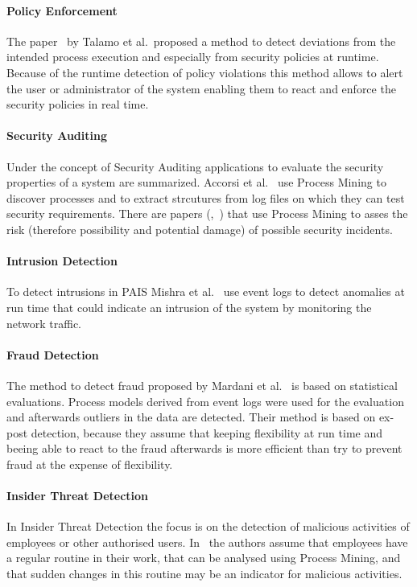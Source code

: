 \documentclass[runningheads]{llncs}
\begin{document}
\paragraph{Policy Enforcement} The paper~\cite{Talamo2013} by Talamo et al.\ proposed a method to detect deviations from the intended process execution and especially from security policies at runtime. Because of the runtime detection of policy violations this
method allows to alert the user or administrator of the system enabling them to react and enforce the security policies in real time.
\paragraph{Security Auditing} Under the concept of Security Auditing applications to evaluate the security properties of a system are summarized. Accorsi et al.~\cite{Accorsi20131462} use Process Mining to discover processes and to extract strcutures from log files
on which they can test security requirements. There are papers (\cite{Yunizal20221387},~\cite{Dedousis202235}) that use Process Mining to asses the risk (therefore possibility and potential damage) of possible security incidents.
\paragraph{Intrusion Detection} To detect intrusions in PAIS Mishra et al.~\cite{Mishra2018613} use event logs to detect anomalies at run time that could indicate an intrusion of the system by monitoring the network traffic.
\paragraph{Fraud Detection} The method to detect fraud proposed by Mardani et al.~\cite{Mardani2013} is based on statistical evaluations. Process models derived from event logs were used for the evaluation and afterwards outliers in the data are detected. Their method
is based on ex-post detection, because they assume that keeping flexibility at run time and beeing able to react to the fraud afterwards is more efficient than try to prevent fraud at the expense of flexibility.
\paragraph{Insider Threat Detection} In Insider Threat Detection the focus is on the detection of malicious activities of employees or other authorised users. In~\cite{MacAk2020} the authors assume that employees have a regular routine in their work, that can be
analysed using Process Mining, and that sudden changes in this routine may be an indicator for malicious activities.
\end{document}
